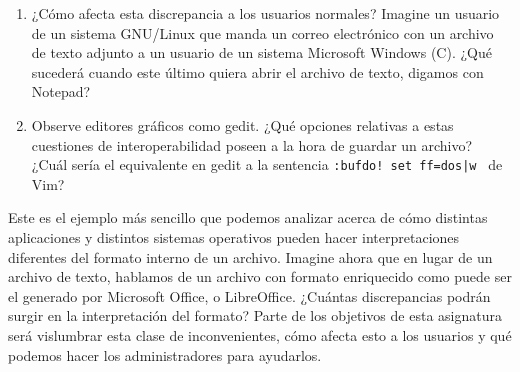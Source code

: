 \documentclass[12pt]{article}
\begin{document}
\begin{enumerate}
	\item ¿Cómo afecta esta discrepancia a los usuarios normales? Imagine un usuario de un 
	sistema GNU/Linux que manda un correo electrónico con un archivo de texto adjunto a un usuario de un 
	sistema Microsoft Windows (C). ¿Qué sucederá cuando este último quiera abrir el archivo 
	de texto, digamos con Notepad?
	\item Observe editores gráficos como gedit. ¿Qué opciones relativas a estas cuestiones de 
	interoperabilidad poseen a la hora de guardar un archivo? ¿Cuál sería el equivalente en  
	gedit a la sentencia {\tt :bufdo! set ff=dos|w } de Vim? 
\end{enumerate}
     
Este es el ejemplo más sencillo que podemos analizar acerca de cómo distintas aplicaciones y 
distintos sistemas operativos pueden hacer interpretaciones diferentes del formato interno de 
un archivo. Imagine ahora que en lugar de un archivo de texto, hablamos de un archivo con 
formato enriquecido como puede ser el generado por Microsoft Office, o LibreOffice. ¿Cuántas
discrepancias podrán surgir en la interpretación del formato? Parte de los objetivos de 
esta asignatura será vislumbrar esta clase de inconvenientes, cómo afecta esto a los usuarios y
qué podemos hacer los administradores para ayudarlos. 
 
\end{document}
